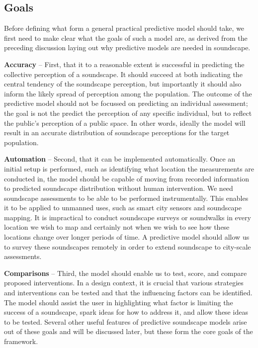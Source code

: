 \documentclass[
  authoryear,
  preprint,
  1p]{elsarticle}
\begin{document}
\hypertarget{goals}{%
\subsection{Goals}\label{goals}}

Before defining what form a general practical predictive model should
take, we first need to make clear what the goals of such a model are, as
derived from the preceding discussion laying out why predictive models
are needed in soundscape.

\textbf{Accuracy} -- First, that it to a reasonable extent is successful
in predicting the collective perception \citep[see][]{Mitchell2022How}
of a soundscape. It should succeed at both indicating the central
tendency of the soundscape perception, but importantly it should also
inform the likely spread of perception among the population. The outcome
of the predictive model should not be focussed on predicting an
individual assessment; the goal is not the predict the perception of any
specific individual, but to reflect the public's perception of a public
space. In other words, ideally the model will result in an accurate
distribution of soundscape perceptions for the target population.

\textbf{Automation} -- Second, that it can be implemented automatically.
Once an initial setup is performed, such as identifying what location
the measurements are conducted in, the model should be capable of moving
from recorded information to predicted soundscape distribution without
human intervention. We need soundscape assessments to be able to be
performed instrumentally. This enables it to be applied to unmanned
uses, such as smart city sensors and soundscape mapping. It is
impractical to conduct soundscape surveys or soundwalks in every
location we wish to map and certainly not when we wish to see how these
locations change over longer periods of time. A predictive model should
allow us to survey these soundscapes remotely in order to extend
soundscape to city-scale assessments.

\textbf{Comparisons} -- Third, the model should enable us to test,
score, and compare proposed interventions. In a design context, it is
crucial that various strategies and interventions can be tested and that
the influencing factors can be identified. The model should assist the
user in highlighting what factor is limiting the success of a
soundscape, spark ideas for how to address it, and allow these ideas to
be tested. Several other useful features of predictive soundscape models
arise out of these goals and will be discussed later, but these form the
core goals of the framework.
\end{document}
